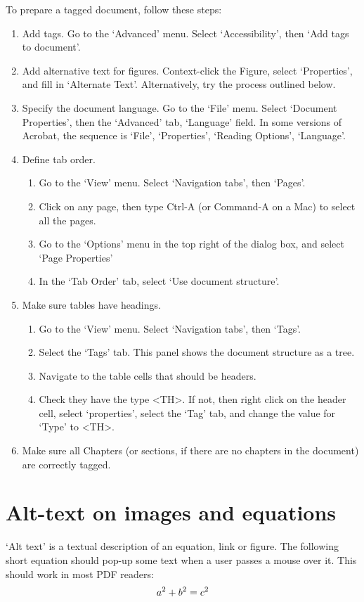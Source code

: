 To prepare a tagged document, follow these steps:
\begin{enumerate}
\item Add tags. Go to the `Advanced' menu. Select `Accessibility', then `Add tags to document'.
\item Add alternative text for figures. Context-click the Figure, select `Properties', and fill in `Alternate Text'. Alternatively, try the process outlined below.
\item Specify the document language. Go to the `File' menu. Select `Document Properties', then the `Advanced' tab, `Language' field. In some versions of Acrobat, the sequence is `File', `Properties', `Reading Options', `Language'.
\item Define tab order.
\begin{enumerate}
\item Go to the `View' menu. Select `Navigation tabs', then `Pages'.
\item Click on any page, then type Ctrl-A (or Command-A on a Mac) to select all the pages.
\item Go to the `Options' menu in the top right of the dialog box, and select `Page Properties'
\item In the `Tab Order' tab, select `Use document structure'.
\end{enumerate}
\item Make sure tables have headings. 
\begin{enumerate}
\item Go to the `View' menu. Select `Navigation tabs', then `Tags'.
\item Select the `Tags' tab. This panel shows the document structure as a tree.
\item Navigate to the table cells that should be headers.
\item Check they have the type <TH>. If not, then right click on the header cell, select `properties', select the `Tag' tab, and change the value for `Type' to <TH>.
\end{enumerate}
\item Make sure all Chapters (or sections, if there are no chapters in the document) are correctly tagged.
\end{enumerate}

\section{Alt-text on images and equations}
`Alt text' is a textual description of an equation, link or figure. The following short equation should pop-up some text when a user passes a mouse over it. This should work in most PDF readers:
\begin{equation}
\pdftooltip{a^2+b^2=c^2}{An equation}
\end{equation}

